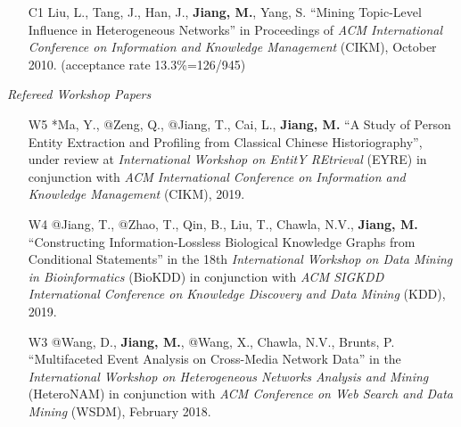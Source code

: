 \documentclass[10pt]{article}
\newenvironment{myindentpar}[1]%
{\begin{list}{}%
         {\setlength{\leftmargin}{#1}}%
         \item[]%
}
{\end{list}}
\newcounter{list}
\begin{document}
\begin{myindentpar}{0.00cm}
\begin{enumerate}[leftmargin=.5cm]
\item[C1] Liu, L., Tang, J., Han, J., \textbf{Jiang, M.}, Yang, S. ``Mining Topic-Level Influence in Heterogeneous Networks'' in Proceedings of \emph{ACM International Conference on Information and Knowledge Management} (CIKM), October 2010. (acceptance rate 13.3\%=126/945)

\vspace{-0.1cm}

\end{enumerate}

\hspace{-0.25cm}\emph{Refereed Workshop Papers}

\begin{enumerate}[leftmargin=.5cm]

\item[W5] *Ma, Y., @Zeng, Q., @Jiang, T., Cai, L., \textbf{Jiang, M.} ``A Study of Person Entity Extraction and Profiling from Classical Chinese Historiography'', under review at \textit{International Workshop on EntitY REtrieval} (EYRE) in conjunction with \textit{ACM International Conference on Information and Knowledge Management} (CIKM), 2019.

\vspace{-0.1cm}

\item[W4] @Jiang, T., @Zhao, T., Qin, B., Liu, T., Chawla, N.V., \textbf{Jiang, M.} ``Constructing Information-Lossless Biological Knowledge Graphs from Conditional Statements'' in the 18th \textit{International Workshop on Data Mining in Bioinformatics} (BioKDD) in conjunction with \textit{ACM SIGKDD International Conference on Knowledge Discovery and Data Mining} (KDD), 2019.

\vspace{-0.1cm}
	
\item[W3] @Wang, D., \textbf{Jiang, M.}, @Wang, X., Chawla, N.V., Brunts, P. ``Multifaceted Event Analysis on Cross-Media Network Data'' in the \textit{International Workshop on Heterogeneous Networks Analysis and Mining} (HeteroNAM) in conjunction with \textit{ACM Conference on Web Search and Data Mining} (WSDM), February 2018.


\end{enumerate}
\end{myindentpar}
\end{document}
